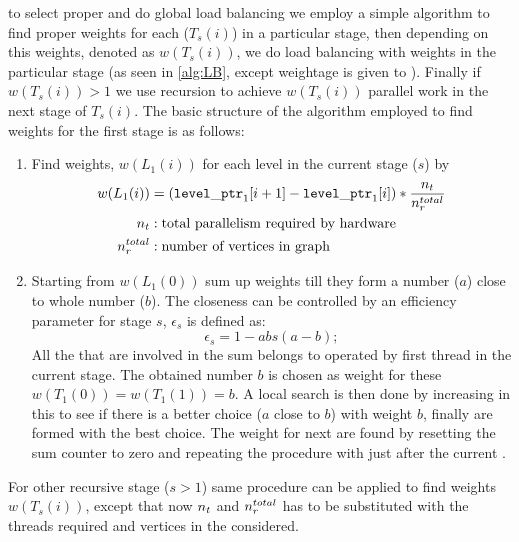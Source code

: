 \Inorder to select proper \subgraph and do global load balancing we employ a simple algorithm to find proper weights for each \levelGroup ($T_s(i)$) in a particular stage, then depending on this weights, denoted as $w(T_s(i))$, we do load balancing with weights in the particular stage (as seen in \cref{alg:LB}, except weightage is given to \levelGroups). Finally if $w(T_s(i)) > 1$ we use recursion to achieve $w(T_s(i))$ parallel work in the next stage of $T_s(i)$. The basic structure of the algorithm employed to find weights for the first stage is as follows:
\begin{enumerate}
	\item Find weights, $w(L_1(i))$ for each level in the current stage ($s$) by
		\begin{align*}
			w(L_1(i)) &= ({\tt level\_ptr}_1[i+1] - {\tt level\_ptr}_1[i])*\frac{n_{t}}{n_{r}^{total}}\\
			n_{t} &: \text{total parallelism required by hardware}\\
			n_{r}^{total} &: \text{number of vertices in graph}
		\end{align*}
	
	\item Starting from $w(L_1(0))$ sum up weights till they form a number ($a$) close to whole number ($b$). The closeness can be controlled by an efficiency parameter for stage $s$, $\epsilon_s$ is defined as:
	\begin{equation} \label{eq:epsilon}
		\epsilon_s =  1 - abs(a-b);
	\end{equation}
	All the \levels that are involved in the sum belongs to \levelGroups  operated by first thread in the current stage. The obtained number $b$ is chosen as weight for these \levelGroups \ie $w(T_1(0))=w(T_1(1))=b$. A local search is then done by increasing \levels in this \levelGroups to see if there is a better choice ($a$ close to $b$) with weight $b$, finally \levelGroups are formed with the best choice.  The weight for next \levelGroups are found by resetting the sum counter to zero and repeating the  procedure with \levels just after the current \levelGroups.
\end{enumerate}
For other recursive stage ($s>1$) same procedure can be applied to find weights $w(T_s(i))$, except that now $n_{t}$ and $n_{r}^{total}$ has to be substituted with the threads required and vertices in the \subgraph considered.